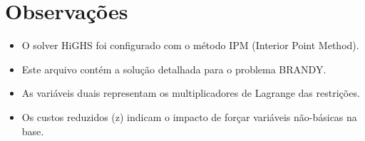 \documentclass[12pt]{article}
\begin{document}
\section{Observações}

\begin{itemize}
\item O solver HiGHS foi configurado com o método IPM (Interior Point Method).
\item Este arquivo contém a solução detalhada para o problema BRANDY.
\item As variáveis duais representam os multiplicadores de Lagrange das restrições.
\item Os custos reduzidos (z) indicam o impacto de forçar variáveis não-básicas na base.
\end{itemize}
\end{document}

